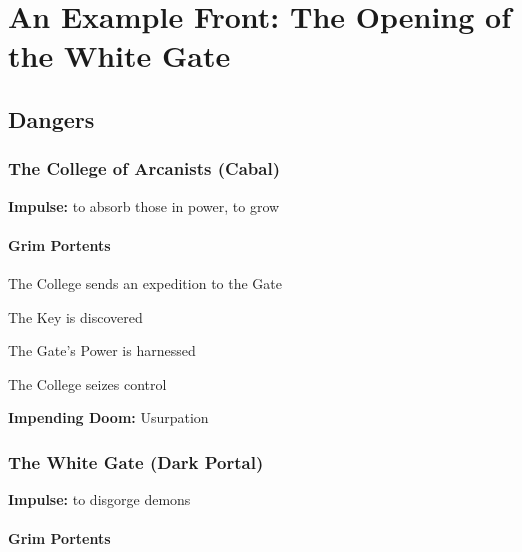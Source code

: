 \chapter{An Example Front: The Opening of the White Gate}
    
 
\section{Dangers}   
 
\subsection{The College of Arcanists (Cabal)}     
 

{\bf Impulse:}  to absorb those in power, to grow

 
\subsubsection{Grim Portents}    
 
\startitemize[1,packed]

\item The College sends an expedition to the Gate

 
\item The Key is discovered

 
\item The Gate's Power is harnessed

 
\item The College seizes control


\stopitemize
 

{\bf Impending Doom:}  Usurpation

 
\subsection{The White Gate (Dark Portal)}      
 

{\bf Impulse:}  to disgorge demons

 
\subsubsection{Grim Portents}    
 

